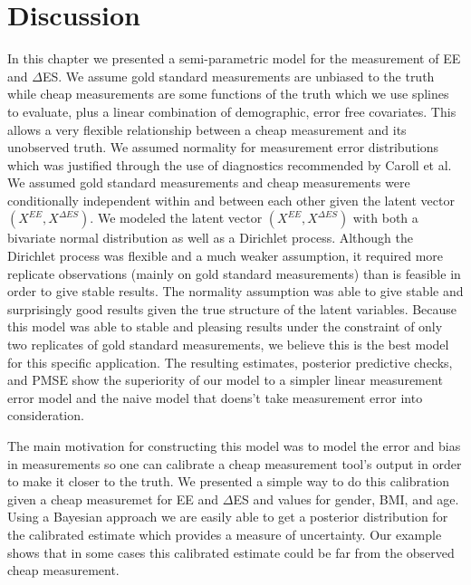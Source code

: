 \documentclass[11pt]{article}\usepackage[]{graphicx}\usepackage[]{color}
\begin{document}
  
  
\section{Discussion}

In this chapter we presented a semi-parametric model for the measurement of EE and $\Delta$ES. We assume gold standard measurements are unbiased to the truth while cheap measurements are some functions of the truth which we use splines to evaluate, plus a linear combination of demographic, error free covariates. This allows a very flexible relationship between a cheap measurement and its unobserved truth. We assumed normality for measurement error distributions which was justified through the use of diagnostics recommended by Caroll et al. We assumed gold standard measurements and cheap measurements were conditionally independent within and between each other given the latent vector $(X^{EE},X^{\Delta ES})$. We modeled the latent vector $(X^{EE},X^{\Delta ES})$ with both a bivariate normal distribution as well as a Dirichlet process. Although the Dirichlet process was flexible and a much weaker assumption, it required more replicate observations (mainly on gold standard measurements) than is feasible in order to give stable results. The normality assumption was able to give stable and surprisingly good results given the true structure of the latent variables. Because this model was able to stable and pleasing results under the constraint of only two replicates of gold standard measurements, we believe this is the best model for this specific application. The resulting estimates, posterior predictive checks, and PMSE show the superiority of our model to a simpler linear measurement error model and the naive model that doens't take measurement error into consideration. 

The main motivation for constructing this model was to model the error and bias in measurements so one can calibrate a cheap measurement tool's output in order to make it closer to the truth. We presented a simple way to do this calibration given a cheap measuremet for EE and $\Delta$ES and values for gender, BMI, and age. Using a Bayesian approach we are easily able to get a posterior distribution for the calibrated estimate which provides a measure of uncertainty. Our example shows that in some cases this calibrated estimate could be far from the observed cheap measurement. 
\end{document}
